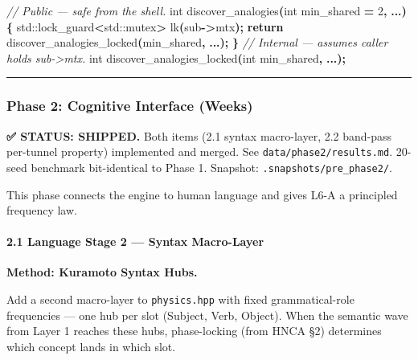 \documentclass[
  11pt,
  a4paper,
]{article}
\newenvironment{Shaded}{\begin{snugshade}}{\end{snugshade}}
\newcommand{\BuiltInTok}[1]{#1}
\newcommand{\CommentTok}[1]{\textcolor[rgb]{0.56,0.35,0.01}{\textit{#1}}}
\newcommand{\ControlFlowTok}[1]{\textcolor[rgb]{0.13,0.29,0.53}{\textbf{#1}}}
\newcommand{\DataTypeTok}[1]{\textcolor[rgb]{0.13,0.29,0.53}{#1}}
\newcommand{\DecValTok}[1]{\textcolor[rgb]{0.00,0.00,0.81}{#1}}
\newcommand{\NormalTok}[1]{#1}
\newcommand{\OperatorTok}[1]{\textcolor[rgb]{0.81,0.36,0.00}{\textbf{#1}}}
\begin{document}
\begin{Shaded}
\begin{Highlighting}[]
\CommentTok{// Public — safe from the shell.}
\DataTypeTok{int}\NormalTok{ discover\_analogies}\OperatorTok{(}\DataTypeTok{int}\NormalTok{ min\_shared }\OperatorTok{=} \DecValTok{2}\OperatorTok{,} \OperatorTok{...)} \OperatorTok{\{}
    \BuiltInTok{std::}\NormalTok{lock\_guard}\OperatorTok{\textless{}}\BuiltInTok{std::}\NormalTok{mutex}\OperatorTok{\textgreater{}}\NormalTok{ lk}\OperatorTok{(}\NormalTok{sub}\OperatorTok{{-}\textgreater{}}\NormalTok{mtx}\OperatorTok{);}
    \ControlFlowTok{return}\NormalTok{ discover\_analogies\_locked}\OperatorTok{(}\NormalTok{min\_shared}\OperatorTok{,} \OperatorTok{...);}
\OperatorTok{\}}
\CommentTok{// Internal — assumes caller holds sub{-}\textgreater{}mtx.}
\DataTypeTok{int}\NormalTok{ discover\_analogies\_locked}\OperatorTok{(}\DataTypeTok{int}\NormalTok{ min\_shared}\OperatorTok{,} \OperatorTok{...);}
\end{Highlighting}
\end{Shaded}

\begin{center}\rule{0.5\linewidth}{0.5pt}\end{center}

\subsubsection{Phase 2: Cognitive Interface
(Weeks)}\label{phase-2-cognitive-interface-weeks}

\textbf{✅ STATUS: SHIPPED.} Both items (2.1 syntax macro-layer, 2.2
band-pass per-tunnel property) implemented and merged. See
\texttt{data/phase2/results.md}. 20-seed benchmark bit-identical to
Phase 1. Snapshot: \texttt{.snapshots/pre\_phase2/}.

This phase connects the engine to human language and gives L6-A a
principled frequency law.

\paragraph{2.1 Language Stage 2 --- Syntax
Macro-Layer}\label{language-stage-2-syntax-macro-layer}

\textbf{Method: Kuramoto Syntax Hubs.}

Add a second macro-layer to \texttt{physics.hpp} with fixed
grammatical-role frequencies --- one hub per slot (Subject, Verb,
Object). When the semantic wave from Layer 1 reaches these hubs,
phase-locking (from HNCA §2) determines which concept lands in which
slot.
\end{document}

